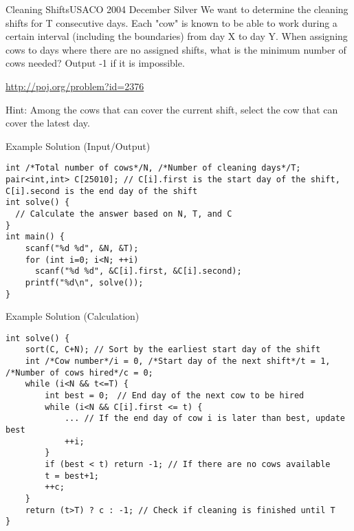\begin{pbox}{Cleaning Shifts}{USACO 2004 December Silver}
We want to determine the cleaning shifts for T consecutive days. Each "cow" is known to be able to work during a certain interval (including the boundaries) from day X to day Y. When assigning cows to days where there are no assigned shifts, what is the minimum number of cows needed? Output -1 if it is impossible.

\url{http://poj.org/problem?id=2376}
\end{pbox}

Hint: Among the cows that can cover the current shift, select the cow that can cover the latest day.


Example Solution (Input/Output)
\begin{cbox}
\begin{verbatim}
int /*Total number of cows*/N, /*Number of cleaning days*/T;
pair<int,int> C[25010]; // C[i].first is the start day of the shift, C[i].second is the end day of the shift
int solve() {
  // Calculate the answer based on N, T, and C
}
int main() {
    scanf("%d %d", &N, &T);
    for (int i=0; i<N; ++i)
      scanf("%d %d", &C[i].first, &C[i].second);
    printf("%d\n", solve());
}
\end{verbatim}
\end{cbox}

Example Solution (Calculation)
\begin{cbox}
\begin{verbatim}
int solve() {
    sort(C, C+N); // Sort by the earliest start day of the shift
    int /*Cow number*/i = 0, /*Start day of the next shift*/t = 1, /*Number of cows hired*/c = 0;
    while (i<N && t<=T) {
        int best = 0;　// End day of the next cow to be hired
        while (i<N && C[i].first <= t) {
            ... // If the end day of cow i is later than best, update best
            ++i;
        }
        if (best < t) return -1; // If there are no cows available
        t = best+1;
        ++c;
    }
    return (t>T) ? c : -1; // Check if cleaning is finished until T
}
\end{verbatim}
\end{cbox}

